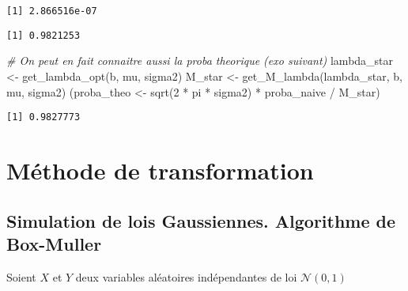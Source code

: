 \documentclass[
]{article}
\newenvironment{Shaded}{\begin{snugshade}}{\end{snugshade}}
\newcommand{\CommentTok}[1]{\textcolor[rgb]{0.56,0.35,0.01}{\textit{#1}}}
\newcommand{\DecValTok}[1]{\textcolor[rgb]{0.00,0.00,0.81}{#1}}
\newcommand{\FunctionTok}[1]{\textcolor[rgb]{0.00,0.00,0.00}{#1}}
\newcommand{\NormalTok}[1]{#1}
\newcommand{\OtherTok}[1]{\textcolor[rgb]{0.56,0.35,0.01}{#1}}
\newcommand{\SpecialCharTok}[1]{\textcolor[rgb]{0.00,0.00,0.00}{#1}}
\begin{document}
\begin{verbatim}
[1] 2.866516e-07
\end{verbatim}

\begin{Shaded}
\end{Shaded}

\begin{verbatim}
[1] 0.9821253
\end{verbatim}

\begin{Shaded}
\begin{Highlighting}[]
\CommentTok{\# On peut en fait connaitre aussi la proba theorique (exo suivant)}
\NormalTok{lambda\_star }\OtherTok{\textless{}{-}} \FunctionTok{get\_lambda\_opt}\NormalTok{(b, mu, sigma2)}
\NormalTok{M\_star }\OtherTok{\textless{}{-}} \FunctionTok{get\_M\_lambda}\NormalTok{(lambda\_star, b, mu, sigma2)}
\NormalTok{(proba\_theo }\OtherTok{\textless{}{-}} \FunctionTok{sqrt}\NormalTok{(}\DecValTok{2} \SpecialCharTok{*}\NormalTok{ pi }\SpecialCharTok{*}\NormalTok{ sigma2) }\SpecialCharTok{*}\NormalTok{ proba\_naive }\SpecialCharTok{/}\NormalTok{ M\_star)}
\end{Highlighting}
\end{Shaded}

\begin{verbatim}
[1] 0.9827773
\end{verbatim}

\hypertarget{muxe9thode-de-transformation}{%
\section{Méthode de transformation}\label{muxe9thode-de-transformation}}

\hypertarget{simulation-de-lois-gaussiennes.-algorithme-de-box-muller}{%
\subsection{Simulation de lois Gaussiennes. Algorithme de
Box-Muller}\label{simulation-de-lois-gaussiennes.-algorithme-de-box-muller}}

Soient \(X\) et \(Y\) deux variables aléatoires indépendantes de loi
\(\mathcal{N}(0, 1)\)
\end{document}
